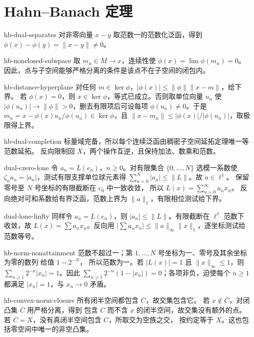 \chapter{Hahn--Banach 定理}
\begin{solution}{hb-dual-separates}
对非零向量 \(x-y\) 取范数一的范数化泛函，得到
\(\phi(x)-\phi(y)=\|x-y\|\ne0\)。
\end{solution}
\begin{solution}{hb-nonclosed-subspace}
取 \(m_n\in M\to x\)，连续性使 \(\phi(x)=\lim\phi(m_n)=0\)。
因此，点与子空间能够严格分离的条件是该点不在子空间的闭包内。
\end{solution}
\begin{solution}{hb-distance-hyperplane}
对任何 \(m\in\ker\phi\)，\(|\phi(x)|\le\|\phi\|\|x-m\|\)，给下界。
若 \(\phi(x)=0\)，则 \(x\in\ker\phi\)，等式已成立。否则取单位向量
\(u_n\) 使 \(|\phi(u_n)|\to\|\phi\|>0\)，删去有限项后可设每项
\(\phi(u_n)\ne0\)。于是
\(m_n=x-\phi(x)u_n/\phi(u_n)\in\ker\phi\)，且
\(\|x-m_n\|\le|\phi(x)|/|\phi(u_n)|\)，取极限得上界。
\end{solution}
\begin{solution}{hb-dual-completion}
标量域完备，所以每个连续泛函由稠密子空间延拓定理唯一等范数延拓。
反向限制回 \(X\)，两个操作互逆，且保持加法、数乘和范数。
\end{solution}
\begin{solution}{dual-czero-lone}
令 \(a_n=L(e_n)\)，\(n\ge0\)。对有限集合 \(\{0,\ldots,N\}\) 选模一系数使
\(\zeta_na_n=|a_n|\)，测试有限支撑单位球元素得
\(\sum_{n=0}^N|a_n|\le\|L\|\)。故 \(a\in\ell^1\)。
保留零号至 \(N\) 号坐标的有限截断在 \(c_0\) 中一致收敛，
所以 \(L(x)=\sum_{n=0}^{\infty}a_nx_n\)。
反向绝对可和系数给有界泛函，范数上界为 \(\|a\|_1\)，有限相位测试给下界。
\end{solution}
\begin{solution}{dual-lone-linfty}
同样令 \(a_n=L(e_n)\)，则 \(|a_n|\le\|L\|\)。有限截断在 \(\ell^1\)
范数下收敛，故 \(L(x)=\sum a_nx_n\)。反向用
\(|\sum a_nx_n|\le\|a\|_\infty\|x\|_1\)，逐坐标测试给范数等号。
\end{solution}
\begin{solution}{hb-norm-nonattainment}
范数不超过一；第 \(1,\ldots,N\) 号坐标为一、零号及其余坐标为零的数列
给值 \(1-2^{-N}\)，
所以范数为一。若 \(|L(x)|=1\) 且 \(\|x\|_\infty\le1\)，则
\(\sum_{n\ge1}2^{-n}|x_n|=1\)。因此
\(\sum_{n\ge1}2^{-n}(1-|x_n|)=0\)；各项非负，迫使每个
\(n\ge1\) 都满足 \(|x_n|=1\)，与 \(x_n\to0\) 矛盾。
\end{solution}
\begin{solution}{hb-convex-norm-closure}
所有闭半空间都包含 \(\overline C\)，故交集包含它。
若 \(x\notin\overline C\)，对闭凸集 \(\overline C\) 用严格分离，得到
包含 \(C\) 而不含 \(x\) 的闭半空间，故交集没有额外的点。
若 \(\overline C=X\)，没有真闭半空间包含 \(C\)，所取交为空族之交，
按约定等于 \(X\)。这也包括零空间中唯一的非空凸集。
\end{solution}
